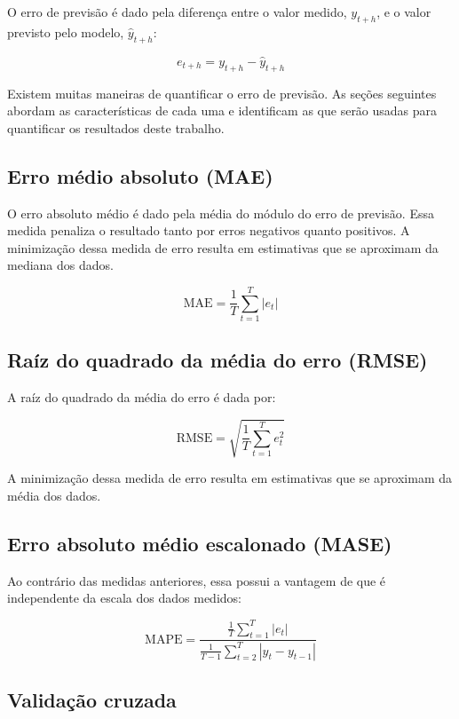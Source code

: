 \documentclass[
	12pt,				%
	openright,			%
	oneside,			%
	a4paper,			%
	english,			%
	french,				%
	spanish,			%
	brazil				%
	]{abntex2}
\begin{document}

O erro de previsão é dado pela diferença entre o valor medido, $y_{t+h}$, e o valor previsto pelo modelo, $\hat{y}_{t+h}$:

$$e_{t+h} = y_{t+h} - \hat{y}_{t+h}$$

Existem muitas maneiras de quantificar o erro de previsão. As seções seguintes abordam as características de cada uma e identificam as que serão usadas para quantificar os resultados deste trabalho.

\subsection{Erro médio absoluto (MAE)}

O erro absoluto médio é dado pela média do módulo do erro de previsão. Essa medida penaliza o resultado tanto por erros negativos quanto positivos. A minimização dessa medida de erro resulta em estimativas que se aproximam da mediana dos dados.

$$\text{MAE} = \frac{1}{T}\sum_{t=1}^{T}\left|e_{t}\right|$$

\subsection{Raíz do quadrado da média do erro (RMSE)}

A raíz do quadrado da média do erro é dada por:

$$\text{RMSE} = \sqrt{\frac{1}{T}\sum_{t=1}^{T}e_{t}^2}$$

A minimização dessa medida de erro resulta em estimativas que se aproximam da média dos dados.

\subsection{Erro absoluto médio escalonado (MASE)}

Ao contrário das medidas anteriores, essa possui a vantagem de que é independente da escala dos dados medidos:

$$\text{MAPE} = \frac{\frac{1}{T}\sum_{t=1}^T\left|e_t\right|}{\frac{1}{T-1}\sum_{t=2}^{T}\left|y_t-y_{t-1}\right|}$$

\subsection{Validação cruzada}\label{cruzada}
\end{document}
